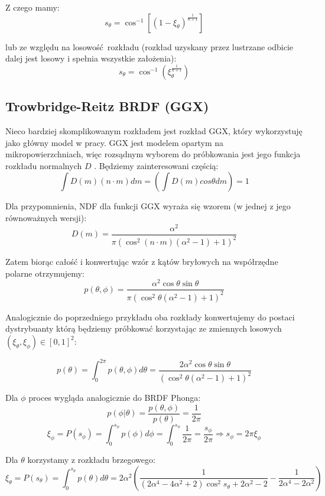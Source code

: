 \documentclass[../main.tex]{subfiles}
\begin{document}
Z czego mamy:
\[
	s_{\theta} =
	\cos^{-1}\left[
		(1 - \xi_{\theta})^{\frac{1}{n+1}}
	\right]
\]

lub ze względu na losowość rozkładu (rozkład uzyskany przez lustrzane odbicie
dalej jest losowy i spełnia wszystkie założenia):
\[
	s_{\theta} =
	\cos^{-1}\left(
		\xi_{\theta}^{\frac{1}{n+1}}
	\right)
\]

\subsection{Trowbridge-Reitz BRDF (GGX)}

Nieco bardziej skomplikowanym rozkładem jest rozkład GGX, który wykorzystuję jako główny model w pracy. GGX jest modelem opartym na mikropowierzchniach, więc rozsądnym wyborem do próbkowania jest jego funkcja rozkładu normalnych $D$ \cite{NotesImportanceSampling}. Będziemy zainteresowani częścią:
\[
  \int D(m) (n \cdot m) dm = \left(\int D(m) cos\theta dm\right) = 1
\]

Dla przypomnienia, NDF dla funkcji GGX wyraża się wzorem (w jednej z jego równoważnych wersji):
\[
	D(m) = \frac{
		\alpha^2
	}{
    \pi \left(
      \cos^{2}(n \cdot m)(\alpha^2 - 1) + 1
    \right)^{2}
  }
\]

Zatem biorąc całość i konwertując wzór z kątów bryłowych na współrzędne polarne otrzymujemy:
\[
  p(\theta, \phi) =
	\frac{
    \alpha^2 \cos\theta \sin\theta
	}{
    \pi \left(
      \cos^{2}\theta (\alpha^2 - 1) + 1
    \right)^{2}
  }
\]

Analogicznie do poprzedniego przykładu oba rozkłady konwertujemy do postaci
dystrybuanty którą będziemy próbkować korzystając ze zmiennych losowych
  $(\xi_{\theta}, \xi_{\phi}) \in [0,1]^2$:

\[
  p(\theta) = \int_{0}^{2\pi} {
    p(\theta, \phi) d \theta
  } =
  \frac{2 \alpha^2 \cos\theta \sin\theta}{
    \left(
      \cos^{2}\theta (\alpha^2 - 1) + 1
    \right)^{2}
  }
\]

Dla $\phi$ proces wygląda analogicznie do BRDF Phonga:
\[
  p(\phi | \theta) = \frac{
    p(\theta, \phi)
	}{
		p(\theta)
	} = \frac{1}{2\pi}
\]
\[
	\xi_\phi = P(s_{\phi}) =
	\int_{0}^{s_{\phi}} {
		p(\phi) d\phi
	} =
	\int_{0}^{s_{\phi}} {
		\frac{1}{2\pi}
	} =
	\frac{s_{\phi}}{2\pi}
  \Rightarrow
	s_{\phi} = 2 \pi \xi_{\phi}
\]

Dla $\theta$ korzystamy z rozkładu brzegowego:
\[
  \xi_\theta = P(s_{\theta}) =
	\int_{0}^{s_{\theta}} {
		p(\theta) d\theta
	} =
  2 \alpha^2 \left(
    \frac{1}{
      (2\alpha^4 - 4\alpha^2 + 2) \cos^{2}{s_\theta} + 2\alpha^2 - 2
    } - \frac{1}{
      2\alpha^4 - 2\alpha^2
    }
  \right)
\]
\end{document}
